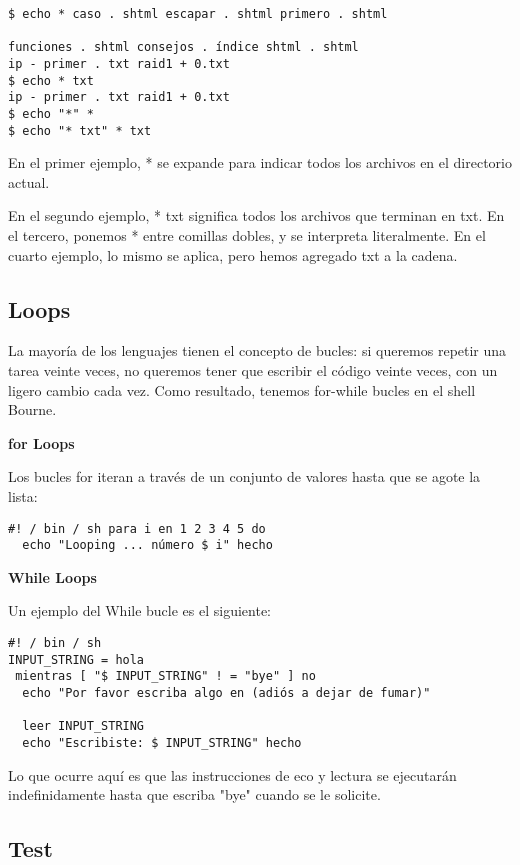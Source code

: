 \documentclass[12pt]{article}
\begin{document}
\begin{verbatim}
$ echo * caso . shtml escapar . shtml primero . shtml

funciones . shtml consejos . índice shtml . shtml
ip - primer . txt raid1 + 0.txt
$ echo * txt
ip - primer . txt raid1 + 0.txt
$ echo "*" *
$ echo "* txt" * txt
\end{verbatim}

En el primer ejemplo, * se expande para indicar todos los archivos en el directorio actual.

En el segundo ejemplo, * txt significa todos los archivos que terminan en txt.
En el tercero, ponemos * entre comillas dobles, y se interpreta literalmente.
En el cuarto ejemplo, lo mismo se aplica, pero hemos agregado txt a la cadena.

\subsection{Loops}

La mayoría de los lenguajes tienen el concepto de bucles: si queremos repetir una tarea veinte veces, no queremos tener que escribir el código veinte veces, con un ligero cambio cada vez. Como resultado, tenemos for-while bucles en el shell Bourne.

\textbf{for Loops}

Los bucles for iteran a través de un conjunto de valores hasta que se agote la lista:

\begin{verbatim}
#! / bin / sh para i en 1 2 3 4 5 do
  echo "Looping ... número $ i" hecho
\end{verbatim}

\textbf{While Loops}

Un ejemplo del While bucle es el siguiente:

\begin{verbatim}
#! / bin / sh
INPUT_STRING = hola
 mientras [ "$ INPUT_STRING" ! = "bye" ] no
  echo "Por favor escriba algo en (adiós a dejar de fumar)"

  leer INPUT_STRING
  echo "Escribiste: $ INPUT_STRING" hecho
\end{verbatim}

Lo que ocurre aquí es que las instrucciones de eco y lectura se ejecutarán indefinidamente hasta que escriba "bye" cuando se le solicite.

\subsection{Test}
\end{document}

